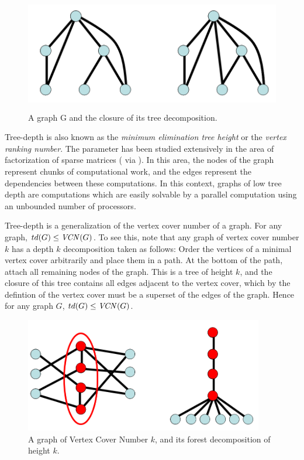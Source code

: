 \documentclass[11pt]{report}
\newcommand{\vcn}{\mbox{\emph{VCN}}}
\begin{document}
\begin{figure}[h]
\begin{center}
\leavevmode
\includegraphics[height=50mm]{Tree_Decomp_v1.png}
\end{center}
\caption{A graph G and the closure of its tree decomposition.}
\label{fig:decomp}
\end{figure}


Tree-depth is also known as the \emph{minimum elimination tree height} or the \emph{vertex ranking number}. The parameter has been studied extensively in the area of factorization of sparse matrices (\cite{Heath91} via \cite{Manne91}). In this area, the nodes of the graph represent chunks of computational work, and the edges represent the dependencies between these computations. In this context, graphs of low tree depth are computations which are easily solvable by a parallel computation using an unbounded number of processors.

Tree-depth is a generalization of the vertex cover number of a graph. For any graph, $td(G)\leq \vcn(G)$. To see this, note that any graph of vertex cover number $k$ has a depth $k$ decomposition taken as follows: Order the vertices of a minimal vertex cover arbitrarily and place them in a path. At the bottom of the path, attach all remaining nodes of the graph. This is a tree of height $k$, and the closure of this tree contains all edges adjacent to the vertex cover, which by the defintion of the vertex cover must be a superset of the edges of the graph. Hence for any graph $G$, $td(G)\leq \vcn(G)$.

\begin{figure}[b]
\begin{center}
\leavevmode
\includegraphics[height=50mm]{VCN_implies_TD_v0.png}
\end{center}
\caption{A graph of Vertex Cover Number $k$, and its forest decomposition of height $k$.}
\label{fig:vcn_implies_td}
\end{figure}
\end{document}
